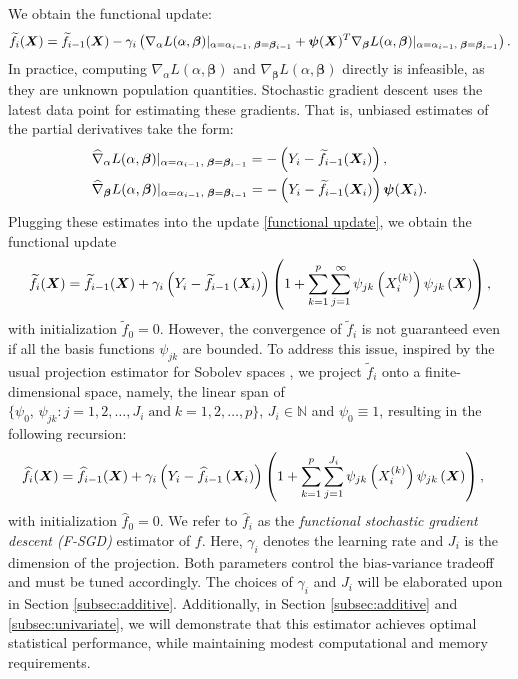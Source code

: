 We obtain the functional update:
\begin{align}
\widetilde{f}_i(\bm{X}) = \widetilde{f}_{i-1}(\bm{X}) - \gamma_i \left( \nabla_{\alpha}L(\alpha, \boldsymbol{\beta})\vert_{\alpha = \alpha_{i-1},\; \boldsymbol{\beta}=\boldsymbol{\beta}_{i-1}} + 
 \boldsymbol{\psi}(\bm{X})^T \nabla_{\boldsymbol{\beta}}L(\alpha, \boldsymbol{\beta})\vert_{\alpha = \alpha_{i-1},\; \boldsymbol{\beta}=\boldsymbol{\beta}_{i-1}}\right). \label{functional update}
\end{align}
In practice, computing $\nabla_{\alpha}L(\alpha, \boldsymbol{\beta})$ and  $\nabla_{\boldsymbol{\beta}}L(\alpha, \boldsymbol{\beta})$ directly is infeasible, as they are unknown population quantities. Stochastic gradient descent uses the latest data point for estimating these gradients.
That is, unbiased estimates of the partial derivatives take the form: 
\begin{align*}
    &\widehat{\nabla}_{\alpha} L(\alpha, \boldsymbol{\beta})\vert_{\alpha = \alpha_{i-1},\; \boldsymbol{\beta}=\boldsymbol{\beta}_{i-1}} = -\left(Y_i-\widetilde{f}_{i-1}(\bm{X}_i)\right),\\
    &\widehat{\nabla}_{\boldsymbol{\beta}} L(\alpha, \boldsymbol{\beta})\vert_{\alpha = \alpha_{i-1},\; \boldsymbol{\beta}=\boldsymbol{\beta}_{i-1}} = -\left(Y_i-\widetilde{f}_{i-1}(\bm{X}_i)\right)\boldsymbol{\psi}(\bm{X}_i).
\end{align*}
Plugging these estimates into the update \eqref{functional update}, we obtain the functional update
\begin{align*}
    \widetilde f_i(\bm{X}) = \widetilde f_{i-1}(\bm{X}) + \gamma_i\left(Y_i - \widetilde f_{i-1}\left(\bm{X}_i\right)\right) \left(1+\sum_{k=1}^p\sum_{j=1}^{\infty}\psi_{jk}\left(X_i^{(k)}\right)\psi_{jk}\left(\bm{X}\right)\right),
\end{align*}
with initialization $\tilde f_0 = 0$. However, the convergence of $\tilde f_i$ is not guaranteed even if all the basis functions $\psi_{jk}$ are bounded. To address this issue, inspired by the usual projection estimator for Sobolev spaces \citep{DBLP:books/daglib/0035708}, we project $\tilde f_i$ onto a finite-dimensional space, namely, the linear span of $ \{\psi_0, \, \psi_{jk} : j = 1, 2, \dots, J_i \; \text{and} \; k = 1, 2, \dots, p \} $, $ J_i \in \mathbb{N} $ and $ \psi_0 \equiv 1$, resulting in the following recursion:
\begin{align}\label{update:l2loss}
    &\widehat{f}_i(\bm{X}) = \widehat{f}_{i-1}(\bm{X}) + \gamma_i\left(Y_i - \widehat{f}_{i-1}\left(\bm{X}_i\right)\right) \left(1+\sum_{k=1}^p\sum_{j=1}^{J_i}\psi_{jk}\left(X_i^{(k)}\right)\psi_{jk}\left(\bm{X}\right)\right),
\end{align}
with  initialization $\hat f_0 = 0$. We refer to $\hat f_i$ as the \textit{functional stochastic gradient descent (F-SGD)} estimator of  $f$. Here, $\gamma_i$ denotes the learning rate and $J_i$ is the dimension of the projection. Both parameters control the bias-variance tradeoff and must be tuned accordingly. The choices of $\gamma_i$ and $J_i$ will be elaborated upon in Section \ref{subsec:additive}. Additionally, in Section \ref{subsec:additive} and \ref{subsec:univariate}, we will demonstrate that this estimator achieves optimal statistical performance, while maintaining modest computational and memory requirements.

